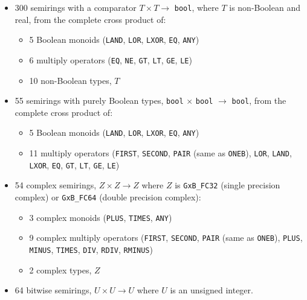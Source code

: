 \documentclass[12pt]{article}
\begin{document}
{\begin{itemize}
\item 300 semirings with a comparator $T \times T \rightarrow$
    \verb'bool', where $T$ is non-Boolean and real, from the complete cross product of:

    \vspace{-0.05in}
    \begin{itemize}
    \item 5 Boolean monoids
    (\verb'LAND', \verb'LOR', \verb'LXOR', \verb'EQ', \verb'ANY')
    \item 6 multiply operators
    (\verb'EQ', \verb'NE', \verb'GT', \verb'LT', \verb'GE', \verb'LE')
    \item 10 non-Boolean types, $T$
    \end{itemize}

\item 55 semirings with purely Boolean types, \verb'bool' $\times$ \verb'bool'
    $\rightarrow$ \verb'bool', from the complete cross product of:

    \vspace{-0.05in}
    \begin{itemize}
    \item 5 Boolean monoids
    (\verb'LAND', \verb'LOR', \verb'LXOR', \verb'EQ', \verb'ANY')
    \item 11 multiply operators
    (\verb'FIRST', \verb'SECOND', \verb'PAIR' (same as \verb'ONEB'),
    \verb'LOR', \verb'LAND', \verb'LXOR',
    \verb'EQ', \verb'GT', \verb'LT', \verb'GE', \verb'LE')
    \end{itemize}

\item 54 complex semirings, $Z \times Z \rightarrow Z$ where $Z$ is
    \verb'GxB_FC32' (single precision complex) or
    \verb'GxB_FC64' (double precision complex):

    \vspace{-0.05in}
    \begin{itemize}
    \item 3 complex monoids (\verb'PLUS', \verb'TIMES', \verb'ANY')
    \item 9 complex multiply operators
        (\verb'FIRST', \verb'SECOND', \verb'PAIR' (same as \verb'ONEB'),
        \verb'PLUS', \verb'MINUS',
            \verb'TIMES', \verb'DIV', \verb'RDIV', \verb'RMINUS')
    \item 2 complex types, $Z$
    \end{itemize}

\item 64 bitwise semirings, $U \times U \rightarrow U$ where $U$ is
    an unsigned integer.


\end{itemize}}
\end{document}

